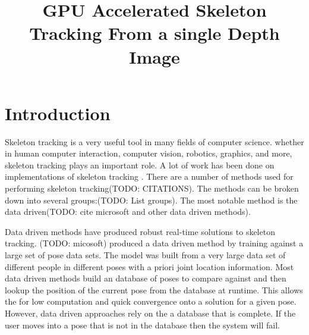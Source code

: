 \documentclass[conference]{IEEEtran}
\begin{document}
%

\title{GPU Accelerated Skeleton Tracking From a single Depth Image}



\author{}

\maketitle

\begin{abstract}
\end{abstract}

\IEEEpeerreviewmaketitle

\section{Introduction}
Skeleton tracking is a very useful tool in many fields of computer science. whether in human computer interaction, computer vision, robotics, graphics, and more, skeleton tracking plays an important role. A lot of work has been done on implementations of skeleton tracking \cite{Ganapathi2010,Bleiweiss2009,Baak2011,Plagemann2010,Knoop2009}. There are a number of methods used for performing skeleton tracking(TODO: CITATIONS). The methods can be broken down into several groups:(TODO: List groups). The most notable method is the data driven\cite{Baak2011}(TODO: cite microsoft and other data driven methods).

Data driven methods have produced robust real-time solutions to skeleton tracking. (TODO: micosoft) produced a data driven method by training against a large set of pose data sets. The model was built from a very large data set of different people in different poses with a priori joint location information. Most data driven methods build an database of poses to compare against and then lookup the position of the current pose from the database at runtime. This allows the for low computation and quick convergence onto a solution for a given pose. However, data driven approaches rely on the a database that is complete. If the user moves into a pose that is not in the database then the system will fail.
\end{document}
